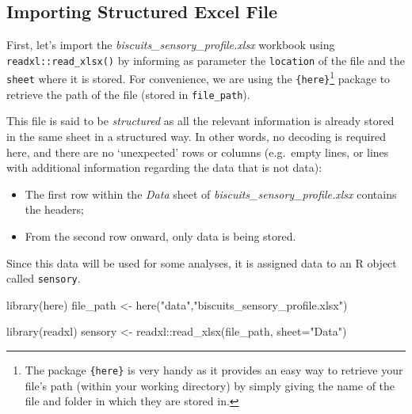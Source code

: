 \documentclass[
]{krantz}
\makeatletter
\newenvironment{Shaded}{\begin{snugshade}}{\end{snugshade}}
\newcommand{\AttributeTok}[1]{\textcolor[rgb]{0.61,0.61,0.61}{#1}}
\newcommand{\FunctionTok}[1]{\textcolor[rgb]{0,0,0}{#1}}
\newcommand{\NormalTok}[1]{#1}
\newcommand{\OtherTok}[1]{\textcolor[rgb]{0.37,0.37,0.37}{#1}}
\newcommand{\SpecialCharTok}[1]{\textcolor[rgb]{0,0,0}{#1}}
\newcommand{\StringTok}[1]{\textcolor[rgb]{0.5,0.5,0.5}{#1}}
\providecommand{\tightlist}{%
  \setlength{\itemsep}{0pt}\setlength{\parskip}{0pt}}
\newenvironment{kframe}{%
\medskip{}
\setlength{\fboxsep}{.8em}
 \def\at@end@of@kframe{}%
 \ifinner\ifhmode%
  \def\at@end@of@kframe{\end{minipage}}%
  \begin{minipage}{\columnwidth}%
 \fi\fi%
 \def\FrameCommand##1{\hskip\@totalleftmargin \hskip-\fboxsep
 \colorbox{shadecolor}{##1}\hskip-\fboxsep
     \hskip-\linewidth \hskip-\@totalleftmargin \hskip\columnwidth}%
 \MakeFramed {\advance\hsize-\width
   \@totalleftmargin\z@ \linewidth\hsize
   \@setminipage}}%
 {\par\unskip\endMakeFramed%
 \at@end@of@kframe}
\renewenvironment{Shaded}{\begin{kframe}}{\end{kframe}}
\makeatother
\begin{document}
\hypertarget{importing-structured-excel-file}{%
\subsection{Importing Structured Excel File}\label{importing-structured-excel-file}}

First, let's import the \emph{biscuits\_sensory\_profile.xlsx} workbook using \texttt{readxl::read\_xlsx()} by informing as parameter the \texttt{location} of the file and the \texttt{sheet} where it is stored. For convenience, we are using the \texttt{\{here\}}\footnote{The package \texttt{\{here\}} is very handy as it provides an easy way to retrieve your file's path (within your working directory) by simply giving the name of the file and folder in which they are stored in.} package to retrieve the path of the file (stored in \texttt{file\_path}).

This file is said to be \emph{structured} as all the relevant information is already stored in the same sheet in a structured way. In other words, no decoding is required here, and there are no `unexpected' rows or columns (e.g.~empty lines, or lines with additional information regarding the data that is not data):

\begin{itemize}
\tightlist
\item
  The first row within the \emph{Data} sheet of \emph{biscuits\_sensory\_profile.xlsx} contains the headers;
\item
  From the second row onward, only data is being stored.
\end{itemize}

Since this data will be used for some analyses, it is assigned data to an R object called \texttt{sensory}.

\begin{Shaded}
\begin{Highlighting}[]
\FunctionTok{library}\NormalTok{(here)}
\NormalTok{file\_path }\OtherTok{\textless{}{-}} \FunctionTok{here}\NormalTok{(}\StringTok{"data"}\NormalTok{,}\StringTok{"biscuits\_sensory\_profile.xlsx"}\NormalTok{) }

\FunctionTok{library}\NormalTok{(readxl)}
\NormalTok{sensory }\OtherTok{\textless{}{-}}\NormalTok{ readxl}\SpecialCharTok{::}\FunctionTok{read\_xlsx}\NormalTok{(file\_path, }\AttributeTok{sheet=}\StringTok{"Data"}\NormalTok{)}
\end{Highlighting}
\end{Shaded}
\end{document}
